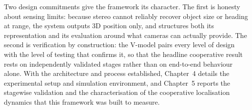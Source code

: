 \bigskip
\noindent Two design commitments give the framework its character. The first is honesty
about sensing limits: because stereo cannot reliably recover object size or heading
at range, the system outputs 3D position only, and structures both its
representation and its evaluation around what cameras can actually provide. The
second is verification by construction: the V-model pairs every level of
design with the level of testing that confirms it, so that the headline cooperative
result rests on independently validated stages rather than on end-to-end behaviour
alone. With the architecture and process established, Chapter~4 details the
experimental setup and simulation environment, and Chapter~5 reports the stagewise
validation and the characterisation of the cooperative localisation dynamics that
this framework was built to measure.
